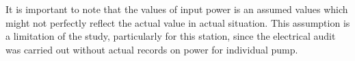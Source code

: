 It is important to note that the values of input power is an assumed values which might not perfectly reflect the actual value in actual situation. This assumption is a limitation of the study, particularly for this station, since the electrical audit was carried out without actual records on power for individual pump. 




%
